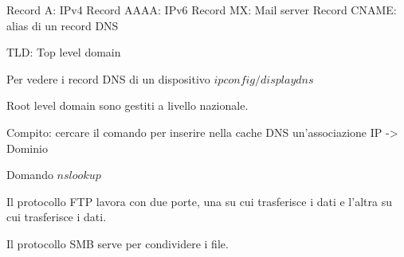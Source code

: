 \documentclass{article}
\begin{document}
    Record A: IPv4
    Record AAAA: IPv6
    Record MX: Mail server
    Record CNAME: alias di un record DNS

    TLD: Top level domain

    Per vedere i record DNS di un dispositivo $ipconfig /displaydns$

    Root level domain sono gestiti a livello nazionale.

    Compito: cercare il comando per inserire nella cache DNS un'associazione IP -> Dominio

    Domando $nslookup$

    Il protocollo FTP lavora con due porte, una su cui trasferisce i dati e l'altra su cui trasferisce i dati.

    Il protocollo SMB serve per condividere i file.
\end{document}
